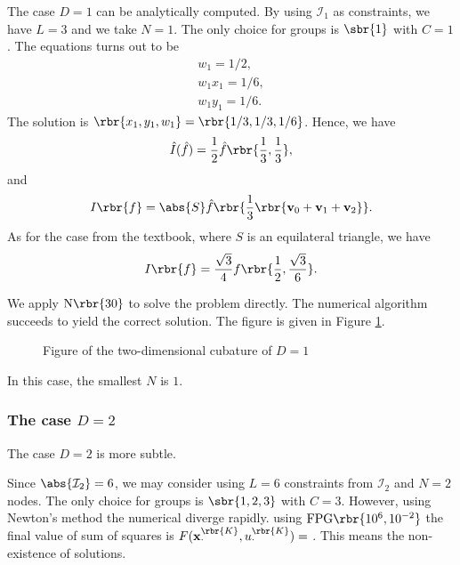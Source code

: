 \documentclass[english, nochinese]{pnote}
\begin{document}
The case $ D = 1 $ can be analytically computed. By using $\mathcal{I}_1$ as constraints, we have $ L = 3 $ and we take $ N = 1 $. The only choice for groups is $\sbr{1}$ with $ C = 1 $. The equations turns out to be
\begin{gather}
w_1 = 1 / 2, \\
w_1 x_1 = 1 / 6, \\
w_1 y_1 = 1 / 6.
\end{gather}
The solution is $ \rbr{ x_1, y_1, w_1 } = \rbr{ 1 / 3, 1 / 3, 1 / 6 } $. Hence, we have
\begin{equation}
\hat{I} (\hat{f}) = \frac{1}{2} \hat{f} \rbr{ \frac{1}{3}, \frac{1}{3} },
\end{equation}
and
\begin{equation}
I \rbr{f} = \abs{S} \hat{f} \rbr{ \frac{1}{3} \rbr{ \mathbf{v}_0 + \mathbf{v}_1 + \mathbf{v}_2 } }.
\end{equation}
As for the case from the textbook, where $S$ is an equilateral triangle, we have
\begin{equation}
I \rbr{f} = \frac{\sqrt{3}}{4} f \rbr{ \frac{1}{2}, \frac{\sqrt{3}}{6} }.
\end{equation}

We apply $ \text{N} \rbr{30} $ to solve the problem directly. The numerical algorithm succeeds to yield the correct solution. The figure is given in Figure \ref{Fig:M2D1}.

\begin{figure}[htbp]
\centering
\scalebox{0.75}{}
\caption{Figure of the two-dimensional cubature of $ D = 1 $}
\label{Fig:M2D1}
\end{figure}

In this case, the smallest $N$ is $1$.

\subsubsection{The case $ D = 2 $}

The case $ D = 2 $ is more subtle.

Since $ \abs{\mathcal{I}_2} = 6 $, we may consider using $ L = 6 $ constraints from $\mathcal{I}_2$ and $ N = 2 $ nodes. The only choice for groups is $ \sbr{ 1, 2, 3 } $ with $ C = 3 $. However, using Newton's method the numerical diverge rapidly. using $ \text{FPG} \rbr{ 10^6, 10^{-2} }$ the final value of sum of squares is $ F ( \mathbf{x}_{\cdot}^{\rbr{K}}, u_{\cdot}^{\rbr{K}} ) = \text{} $. This means the non-existence of solutions.
\end{document}
